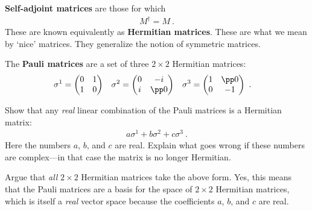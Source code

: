 \textbf{Self-adjoint matrices} are those for which
\begin{align}
M^\dag = M \ .     
\label{eq:self:adjoint}
\end{align}
These are known equivalently as \textbf{Hermitian matrices}.
These are what we mean by `nice' matrices. They generalize the notion of symmetric matrices. 
\begin{example}
The \textbf{Pauli matrices} are a set of three $2\times 2$ Hermitian matrices:
\begin{align}
    \sigma^1
    &=
    \begin{pmatrix}
        0 & 1 \\
        1 & 0
    \end{pmatrix}
    &
    \sigma^2
    &=
    \begin{pmatrix}
        0 & -i \\
        i & \pp 0
    \end{pmatrix}
    &
    \sigma^3
    &=
    \begin{pmatrix}
        1 & \pp 0 \\
        0 & -1
    \end{pmatrix} \ .
\end{align}
\end{example}
\begin{exercise}
Show that any \emph{real} linear combination of the Pauli matrices is a Hermitian matrix:
\begin{align}
    a \sigma^1 + b \sigma^2 + c\sigma^3 \ .
\end{align}
Here the numbers $a$, $b$, and $c$ are real. Explain what goes wrong if these numbers are complex---in that case the matrix is no longer Hermitian.

Argue that \emph{all} $2\times 2$ Hermitian matrices take the above form. Yes, this means that the Pauli matrices are a basis for the space of $2\times 2$ Hermitian matrices, which is itself a \emph{real} vector space because the coefficients $a$, $b$, and $c$ are real.
\end{exercise}






